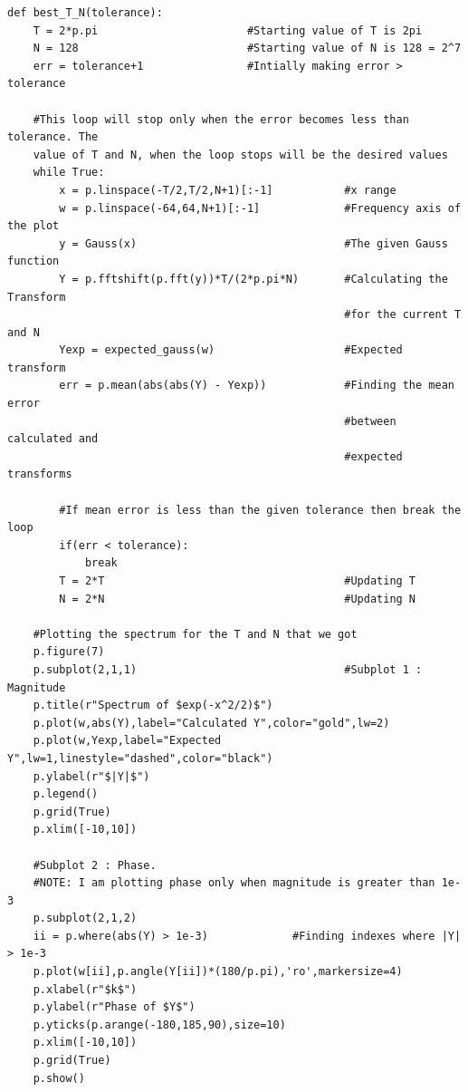 \documentclass[11pt, a4paper]{article}
\begin{document}
        \begin{verbatim}
def best_T_N(tolerance):
    T = 2*p.pi                       #Starting value of T is 2pi
    N = 128                          #Starting value of N is 128 = 2^7
    err = tolerance+1                #Intially making error > tolerance
    
    #This loop will stop only when the error becomes less than tolerance. The
    value of T and N, when the loop stops will be the desired values
    while True:
        x = p.linspace(-T/2,T/2,N+1)[:-1]           #x range
        w = p.linspace(-64,64,N+1)[:-1]             #Frequency axis of the plot
        y = Gauss(x)                                #The given Gauss function
        Y = p.fftshift(p.fft(y))*T/(2*p.pi*N)       #Calculating the Transform 
                                                    #for the current T and N
        Yexp = expected_gauss(w)                    #Expected transform
        err = p.mean(abs(abs(Y) - Yexp))            #Finding the mean error 
                                                    #between calculated and 
                                                    #expected transforms
        
        #If mean error is less than the given tolerance then break the loop
        if(err < tolerance):
            break
        T = 2*T                                     #Updating T
        N = 2*N                                     #Updating N
    
    #Plotting the spectrum for the T and N that we got
    p.figure(7)
    p.subplot(2,1,1)                                #Subplot 1 : Magnitude
    p.title(r"Spectrum of $exp(-x^2/2)$")
    p.plot(w,abs(Y),label="Calculated Y",color="gold",lw=2)                  
    p.plot(w,Yexp,label="Expected Y",lw=1,linestyle="dashed",color="black")  
    p.ylabel(r"$|Y|$")
    p.legend()
    p.grid(True)
    p.xlim([-10,10])
    
    #Subplot 2 : Phase.
    #NOTE: I am plotting phase only when magnitude is greater than 1e-3
    p.subplot(2,1,2)
    ii = p.where(abs(Y) > 1e-3)             #Finding indexes where |Y| > 1e-3
    p.plot(w[ii],p.angle(Y[ii])*(180/p.pi),'ro',markersize=4)
    p.xlabel(r"$k$")
    p.ylabel(r"Phase of $Y$")
    p.yticks(p.arange(-180,185,90),size=10)
    p.xlim([-10,10])
    p.grid(True)
    p.show()
        \end{verbatim}
\end{document}
